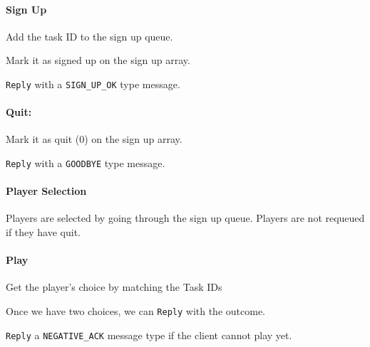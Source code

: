 \documentclass[letterpaper, 12pt]{article}
\begin{document}
\paragraph{Sign Up%
  \label{sign-up}%
}
\setcounter{listcnt0}{0}
\begin{list}{.}
{
\setlength{\rightmargin}{\leftmargin}
}

\item Add the task ID to the sign up queue.

\item Mark it as signed up on the sign up array.

\item \texttt{Reply} with a \texttt{SIGN\_UP\_OK} type message.
\end{list}


\paragraph{Quit:%
  \label{quit}%
}
\setcounter{listcnt0}{0}
\begin{list}{.}
{
\setlength{\rightmargin}{\leftmargin}
}

\item Mark it as quit (0) on the sign up array.

\item \texttt{Reply} with a \texttt{GOODBYE} type message.
\end{list}


\paragraph{Player Selection%
  \label{player-selection}%
}

Players are selected by going through the sign up queue. Players are not requeued if they have quit.


\paragraph{Play%
  \label{play}%
}
\setcounter{listcnt0}{0}
\begin{list}{.}
{
\setlength{\rightmargin}{\leftmargin}
}

\item Get the player's choice by matching the Task IDs

\item Once we have two choices, we can \texttt{Reply} with the outcome.

\item \texttt{Reply} a \texttt{NEGATIVE\_ACK} message type if the client cannot play yet.
\end{list}
\end{document}
